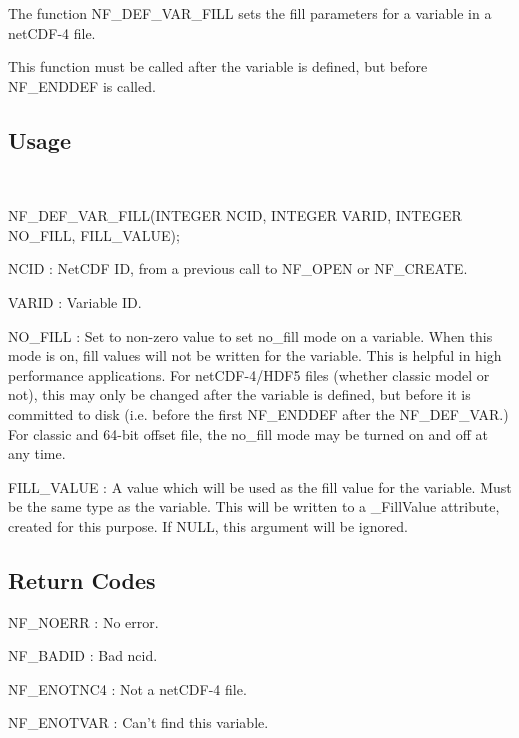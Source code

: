 The function N\+F\+\_\+\+D\+E\+F\+\_\+\+V\+A\+R\+\_\+\+F\+I\+LL sets the fill parameters for a variable in a net\+C\+D\+F-\/4 file.

This function must be called after the variable is defined, but before N\+F\+\_\+\+E\+N\+D\+D\+EF is called.

\subsection*{Usage }

 

N\+F\+\_\+\+D\+E\+F\+\_\+\+V\+A\+R\+\_\+\+F\+I\+L\+L(\+I\+N\+T\+E\+G\+E\+R N\+C\+I\+D, I\+N\+T\+E\+G\+E\+R V\+A\+R\+I\+D, I\+N\+T\+E\+G\+E\+R N\+O\+\_\+\+F\+I\+L\+L, F\+I\+L\+L\+\_\+\+V\+A\+L\+U\+E);

{\ttfamily N\+C\+ID} \+: Net\+C\+DF ID, from a previous call to N\+F\+\_\+\+O\+P\+EN or N\+F\+\_\+\+C\+R\+E\+A\+TE.

{\ttfamily V\+A\+R\+ID} \+: Variable ID.

{\ttfamily N\+O\+\_\+\+F\+I\+LL} \+: Set to non-\/zero value to set no\+\_\+fill mode on a variable. When this mode is on, fill values will not be written for the variable. This is helpful in high performance applications. For net\+C\+D\+F-\/4/\+H\+D\+F5 files (whether classic model or not), this may only be changed after the variable is defined, but before it is committed to disk (i.\+e. before the first N\+F\+\_\+\+E\+N\+D\+D\+EF after the N\+F\+\_\+\+D\+E\+F\+\_\+\+V\+AR.) For classic and 64-\/bit offset file, the no\+\_\+fill mode may be turned on and off at any time.

{\ttfamily F\+I\+L\+L\+\_\+\+V\+A\+L\+UE} \+: A value which will be used as the fill value for the variable. Must be the same type as the variable. This will be written to a \+\_\+\+Fill\+Value attribute, created for this purpose. If N\+U\+LL, this argument will be ignored.

\subsection*{Return Codes }

{\ttfamily N\+F\+\_\+\+N\+O\+E\+RR} \+: No error.

{\ttfamily N\+F\+\_\+\+B\+A\+D\+ID} \+: Bad ncid.

{\ttfamily N\+F\+\_\+\+E\+N\+O\+T\+N\+C4} \+: Not a net\+C\+D\+F-\/4 file.

{\ttfamily N\+F\+\_\+\+E\+N\+O\+T\+V\+AR} \+: Can’t find this variable.

